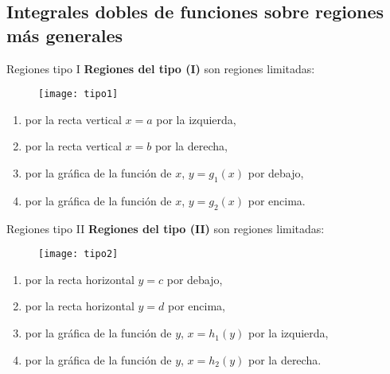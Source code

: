 \documentclass[a4paper, twoside]{article}
\numberwithin{equation}{section}
\numberwithin{figure}{section}
\numberwithin{table}{section}
\begin{document}
\subsection{Integrales dobles de funciones sobre regiones más generales}
\begin{definicion*}{Regiones tipo I}
	\textbf{Regiones del tipo (I)} son regiones limitadas:
	
	\begin{minipage}{0.3\textwidth}
		\begin{figure}[H]
			\centering
			\texttt{[image: tipo1]}
		\end{figure}
	\end{minipage}
	\begin{minipage}{0.7\textwidth}
		\begin{enumerate}
			\item por la recta vertical $x=a$ por la izquierda,
			\item por la recta vertical $x=b$ por la derecha,
			\item por la gráfica de la función de $x$, $y=g_1(x)$ por debajo,
			\item por la gráfica de la función de $x$, $y=g_2(x)$ por encima.
		\end{enumerate}
	\end{minipage}
\end{definicion*}

\begin{definicion*}{Regiones tipo II}
	\textbf{Regiones del tipo (II)} son regiones limitadas:
	
	\begin{minipage}{0.25\textwidth}
		\begin{figure}[H]
			\centering
			\texttt{[image: tipo2]}
		\end{figure}
	\end{minipage}
	\begin{minipage}{0.75\textwidth}
		\begin{enumerate}
			\item por la recta horizontal $y=c$ por debajo,
			\item por la recta horizontal $y=d$ por encima,
			\item por la gráfica de la función de $y$, $x=h_1(y)$ por la izquierda,
			\item por la gráfica de la función de $y$, $x=h_2(y)$ por la derecha.
		\end{enumerate}
	\end{minipage}
\end{definicion*}
\end{document}
